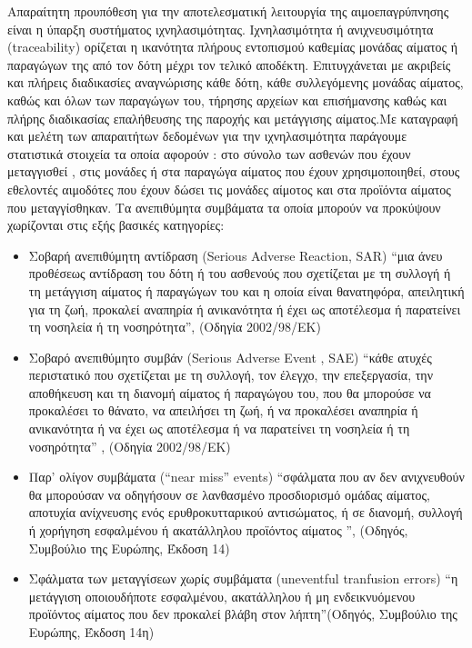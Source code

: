 		
	Απαραίτητη προυπόθεση για την αποτελεσματική λειτουργία της αιμοεπαγρύπνησης είναι η 	ύπαρξη συστήματος ιχνηλασιμότητας. Ιχνηλασιμότητα ή ανιχνευσιμότητα (traceability) ορίζεται η ικανότητα πλήρους εντοπισμού καθεμίας μονάδας αίματος ή παραγώγων της από τον δότη μέχρι τον τελικό αποδέκτη. Επιτυγχάνεται  με ακριβείς και πλήρεις διαδικασίες αναγνώρισης κάθε δότη, κάθε συλλεγόμενης μονάδας αίματος, καθώς και όλων των παραγώγων του, τήρησης αρχείων και επισήμανσης καθώς και πλήρης διαδικασίας επαλήθευσης της παροχής και μετάγγισης αίματος.Με καταγραφή και μελέτη των απαραιτήτων  δεδομένων για την ιχνηλασιμότητα παράγουμε στατιστικά στοιχεία τα οποία αφορούν : στο  σύνολο των ασθενών που έχουν μεταγγισθεί , στις μονάδες ή στα παραγώγα αίματος που έχουν χρησιμοποιηθεί, στους εθελοντές αιμοδότες που έχουν δώσει τις μονάδες αίμοτος και στα προϊόντα αίματος που μεταγγίσθηκαν. 
		Τα ανεπιθύμητα συμβάματα τα οποία μπορούν να προκύψουν χωρίζονται στις εξής βασικές κατηγορίες:
		\begin{itemize}
		\item	 Σοβαρή ανεπιθύμητη αντίδραση (Serious Adverse Reaction, SAR)
		 “μια άνευ προθέσεως αντίδραση του δότη ή του ασθενούς που σχετίζεται με τη συλλογή ή τη μετάγγιση αίματος ή παραγώγων του 			και η οποία είναι θανατηφόρα, απειλητική για τη ζωή, προκαλεί αναπηρία ή ανικανότητα ή έχει ως αποτέλεσμα ή παρατείνει τη νοσηλεία ή τη νοσηρότητα”, (Οδηγία 2002/98/ΕΚ)
 		\item Σοβαρό ανεπιθύμητο συμβάν (Serious Adverse Event , SAE)
 		“κάθε ατυχές περιστατικό που σχετίζεται με τη συλλογή, τον έλεγχο, την επεξεργασία, την αποθήκευση και τη διανομή αίματος ή 				παραγώγου του, που θα μπορούσε να προκαλέσει το θάνατο, να απειλήσει τη ζωή, ή να προκαλέσει αναπηρία ή ανικανότητα ή να έχει ως αποτέλεσμα ή να παρατείνει τη νοσηλεία ή τη νοσηρότητα” , (Οδηγία 2002/98/ΕΚ)
 		\item Παρ’ ολίγον συμβάματα (“near miss” events)
 		 “σφάλματα που αν δεν ανιχνευθούν θα μπορούσαν να οδηγήσουν σε λανθασμένο προσδιορισμό ομάδας αίματος, αποτυχία
 		 ανίχνευσης ενός ερυθροκυτταρικού αντισώματος, ή σε διανομή, συλλογή ή χορήγηση εσφαλμένου ή ακατάλληλου προϊόντος
 		 αίματος ”, (Οδηγός, Συμβούλιο της Ευρώπης, Έκδοση 14) 
 		 \item Σφάλματα των μεταγγίσεων χωρίς συμβάματα (uneventful tranfusion errors)
 		 “η μετάγγιση οποιουδήποτε εσφαλμένου, ακατάλληλου ή μη ενδεικνυόμενου προϊόντος αίματος που δεν προκαλεί βλάβη στον 					λήπτη”(Οδηγός, Συμβούλιο της Ευρώπης, Έκδοση 14η)
 		 \end{itemize} 
 		 
